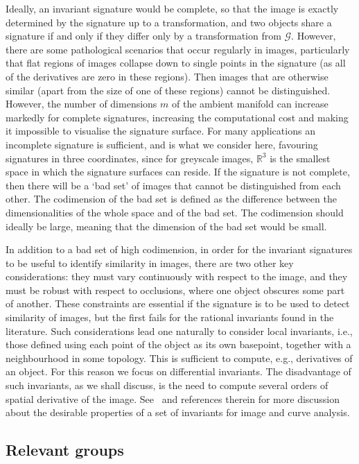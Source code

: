 \documentclass{artjlt}
\begin{document}
Ideally, an invariant signature would be complete, so that the image is exactly determined by the signature up to a transformation, and two objects share a signature if and only if they differ only by a transformation from $\mathcal{G}$. However, there are some pathological scenarios that occur regularly in images, particularly that flat regions of images collapse down to single points in the signature (as all of the derivatives are zero in these regions). Then images that are otherwise similar (apart from the size of one of these regions) cannot be distinguished. However, the number of dimensions $m$ of the ambient manifold can increase markedly for complete signatures, increasing the computational cost and making it impossible to visualise the signature surface. For many applications an incomplete signature is sufficient, and is what we consider here, favouring signatures in three coordinates, since for greyscale images, $\mathbb{R}^3$ is the smallest space in which the signature surfaces can reside.  If the signature is not complete, then there will be a `bad set' of images that cannot be distinguished from each other.  The codimension of the bad set is defined as the difference between the dimensionalities of the whole space and of the bad set. The codimension should ideally be large, meaning that the dimension of the bad set would be small. 

In addition to a bad set of high codimension, in order for the invariant signatures to be useful to identify similarity in images, there are two other key considerations: they must vary continuously with respect to the image, and they must be robust with respect to occlusions, where one object obscures some part of another. These constraints are essential if the signature is to be used to detect similarity of images, but the first fails for the rational invariants found in the literature. Such considerations lead one naturally to consider local invariants, i.e., those defined using each point of the object as its own basepoint, together with a neighbourhood in some topology. This is sufficient to compute, e.g., derivatives of an object. For this reason we focus on differential invariants. The disadvantage of such invariants, as we shall discuss, is the need to compute several orders of spatial derivative of the image. See~\citet{UsMobius} and references therein for more discussion about the desirable properties of a set of invariants for image and curve analysis. 

\subsection{Relevant groups}
\end{document}
